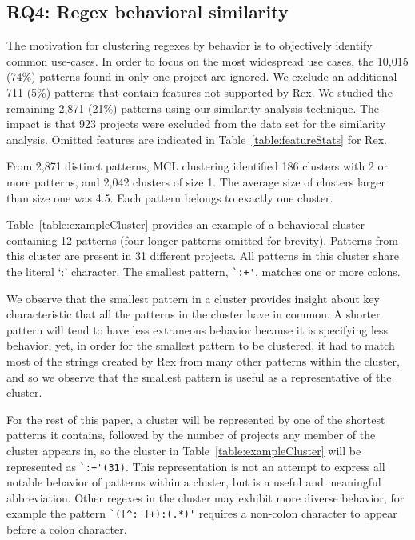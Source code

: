 \subsection{RQ4: Regex behavioral similarity}
\label{rq4:results}


The motivation for clustering regexes by behavior is to objectively identify common use-cases.  In order to focus on the most widespread use cases, the 10,015 (74\%) patterns found in only one project are ignored. We exclude an additional 711 (5\%) patterns that contain features not supported by Rex.  We studied the remaining 2,871 (21\%) patterns using our similarity analysis technique. The impact is that 923 projects were excluded from the data set for the similarity analysis. Omitted features are indicated in Table~\ref{table:featureStats} for Rex.

From 2,871 distinct patterns, MCL clustering identified 186 clusters with 2 or more patterns, and 2,042 clusters of size 1.  The average size of clusters larger than size one was 4.5.  Each pattern belongs to exactly one cluster.



Table~\ref{table:exampleCluster} provides an example of a behavioral cluster containing 12 patterns (four longer patterns omitted for brevity). Patterns from this cluster are present in 31 different projects.  All patterns in this cluster share the literal `:' character. The smallest pattern, \verb!`:+'!,  matches one or more colons.

We observe that the smallest pattern in a cluster provides insight about key characteristic that all the patterns in the cluster have in common.  A shorter pattern will tend to have less extraneous behavior because it is specifying less behavior,
yet, in order for the smallest pattern to be clustered, it had to match most of the strings created by Rex from many other patterns within the cluster, and so we observe that {the smallest pattern is useful as a representative of the cluster}.

For the rest of this paper, a cluster will be represented by one of the shortest patterns it contains, followed by the number of projects any member of the cluster appears in, so the cluster in Table~\ref{table:exampleCluster} will be represented as \verb!`:+'(31)!.  This representation is not an attempt to express all notable behavior of patterns within a cluster, but is a useful and meaningful abbreviation.
Other regexes in the cluster may exhibit more diverse behavior, for example the pattern \verb!`([^: ]+):(.*)'! requires a non-colon character to appear before a colon character.


